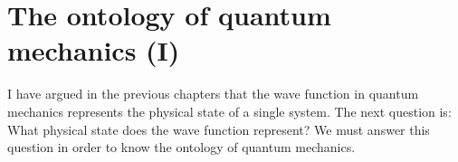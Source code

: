 

\chapter{The ontology of quantum mechanics (I)}







I have argued in the previous chapters that the wave function in quantum mechanics represents the physical state of a single system.
The next question is: What physical state does the wave function represent? We must answer this question in order to know the ontology of quantum mechanics.

